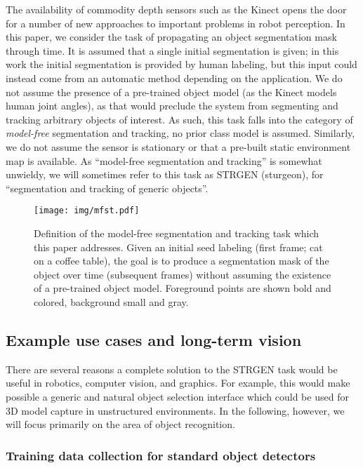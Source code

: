 \documentclass[graybox]{svmult}
\renewcommand{\todo}[1]{\textcolor{red}{}}
\begin{document}
The availability of commodity depth sensors such as the Kinect opens the door for a number of new approaches to important problems in robot perception.  In this paper, we consider the task of propagating an object segmentation mask through time. It is assumed that a single initial segmentation is given; in this work the initial segmentation is provided by human labeling, but this input could instead come from an automatic method depending on the application.  We do not assume the presence of a pre-trained object model (\ie as the Kinect models human joint angles), as that would preclude the system from segmenting and tracking arbitrary objects of interest.  As such, this task falls into the category of \emph{model-free} segmentation and tracking, \ie no prior class model is assumed.  Similarly, we do not assume the sensor is stationary or that a pre-built static environment map is available.  As ``model-free segmentation and tracking'' is somewhat unwieldy, we will sometimes refer to this task as STRGEN (sturgeon), for ``segmentation and tracking of generic objects''. \todo{Not settled on a name yet, but need something.  Happy to hear suggestions.}

\begin{figure}
  \centering
  \texttt{[image: img/mfst.pdf]}
  \caption{Definition of the model-free segmentation and tracking task which this paper addresses.  Given an initial seed labeling (first frame; cat on a coffee table), the goal is to produce a segmentation mask of the object over time (subsequent frames) without assuming the existence of a pre-trained object model.  Foreground points are shown bold and colored, background small and gray.}
  \label{fig:goal}
\end{figure}


\subsection{Example use cases and long-term vision}
\label{sec:examples}

There are several reasons a complete solution to the STRGEN task would be useful in robotics, computer vision, and graphics.  For example, this would make possible a generic and natural object selection interface which could be used for 3D model capture in unstructured environments.  In the following, however, we will focus primarily on the area of object recognition.

\subsubsection{Training data collection for standard object detectors}
\label{sec:trainingintro}
\end{document}
